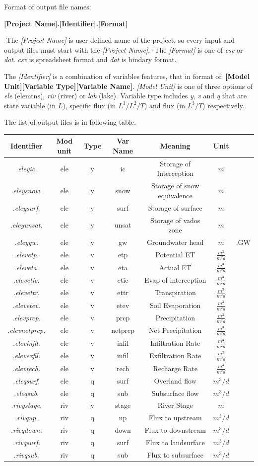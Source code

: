 \documentclass[
]{scrbook}
\begin{document}
Format of output file names:

\textbf{{[}Project Name{]}.{[}Identifier{]}.{[}Format{]}}

-The \emph{{[}Project Name{]}} is user defined name of the project, so every input and output files must start with the \emph{{[}Project Name{]}}.
-The \emph{{[}Format{]}} is one of \emph{csv} or \emph{dat}. \emph{csv} is spreadsheet format and \emph{dat} is bindary format.

The \emph{{[}Identifier{]}} is a combination of variables features, that in format of:
\textbf{{[}Model Unit{]}{[}Variable Type{]}{[}Variable Name{]}}. \emph{{[}Model Unit{]}} is one of three options of \emph{ele} (elemtns), \emph{riv} (river) or \emph{lak} (lake). Variable type includes \emph{y}, \emph{v} and \emph{q} that are state variable (in \(L\)), specific flux (in \(L^3/L^2/T\)) and flux (in \(L^3/T\)) respectively.

The list of output files is in following table.

\begin{longtable}[]{@{}ccccccc@{}}
\toprule
Identifier & Mod unit & Type & Var Name & Meaning & Unit &\tabularnewline
\midrule
\endhead
\emph{.eleyic.} & ele & y & ic & Storage of Interception & \(m\) &\tabularnewline
\emph{.eleysnow.} & ele & y & snow & Storage of snow equivalence & \(m\) &\tabularnewline
\emph{.eleysurf.} & ele & y & surf & Storage of surface & \(m\) &\tabularnewline
\emph{.eleyunsat.} & ele & y & unsat & Storage of vados zone & \(m\) &\tabularnewline
\emph{.eleygw.} & ele & y & gw & Groundwater head & \(m\) & .GW\tabularnewline
\emph{.elevetp.} & ele & v & etp & Potential ET & \(\frac{m^3}{m^2 d}\) &\tabularnewline
\emph{.eleveta.} & ele & v & eta & Actual ET & \(\frac{m^3}{m^2 d}\) &\tabularnewline
\emph{.elevetic.} & ele & v & etic & Evap of interception & \(\frac{m^3}{m^2 d}\) &\tabularnewline
\emph{.elevettr.} & ele & v & ettr & Transpiration & \(\frac{m^3}{m^2 d}\) &\tabularnewline
\emph{.elevetev.} & ele & v & etev & Soil Evaporation & \(\frac{m^3}{m^2 d}\) &\tabularnewline
\emph{.elevprcp.} & ele & v & prcp & Precipitation & \(\frac{m^3}{m^2 d}\) &\tabularnewline
\emph{.elevnetprcp.} & ele & v & netprcp & Net Precipitation & \(\frac{m^3}{m^2 d}\) &\tabularnewline
\emph{.elevinfil.} & ele & v & infil & Infiltration Rate & \(\frac{m^3}{m^2 d}\) &\tabularnewline
\emph{.elevexfil.} & ele & v & infil & Exfiltration Rate & \(\frac{m^3}{m^2 d}\) &\tabularnewline
\emph{.elevrech.} & ele & v & rech & Recharge Rate & \(\frac{m^3}{m^2 d}\) &\tabularnewline
\emph{.eleqsurf.} & ele & q & surf & Overland flow & \(m^3/d\) &\tabularnewline
\emph{.eleqsub.} & ele & q & sub & Subsurface flow & \(m^3/d\) &\tabularnewline
\emph{.rivystage.} & riv & y & stage & River Stage & \(m\) &\tabularnewline
\emph{.rivqup.} & riv & q & up & Flux to upstream & \(m^3/d\) &\tabularnewline
\emph{.rivqdown.} & riv & q & down & Flux to downstream & \(m^3/d\) &\tabularnewline
\emph{.rivqsurf.} & riv & q & surf & Flux to landsurface & \(m^3/d\) &\tabularnewline
\emph{.rivqsub.} & riv & q & sub & Flux to subsurface & \(m^3/d\) &\tabularnewline
\bottomrule
\end{longtable}
\end{document}
